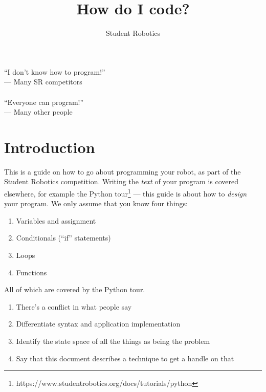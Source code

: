 \documentclass[a4paper,10pt]{article}
\title{How do I code?}
\author{Student Robotics}
\begin{document}
\maketitle

\hfill ``I don't know how to program!''\\
\hphantom{fgasdf}\hfill --- Many SR competitors\\
\\
``Everyone can program!''\\
--- Many other people\\

\section{Introduction}

This is a guide on how to go about programming your robot, as part of the
Student Robotics competition. Writing the \textit{text} of your program is
covered elsewhere, for example the Python
tour\footnote{https://www.studentrobotics.org/docs/tutorials/python} --- this
guide is about how to \textit{design} your program. We only assume that you
know four things:
\begin{enumerate}
	\item Variables and assignment
	\item Conditionals (``if'' statements)
	\item Loops
	\item Functions
\end{enumerate}
All of which are covered by the Python tour.


\begin{enumerate}
\item There's a conflict in what people say
\item Differentiate syntax and application implementation
\item Identify the state space of all the things as being the problem
\item Say that this document describes a technique to get a handle on that
\end{enumerate}
\end{document}
